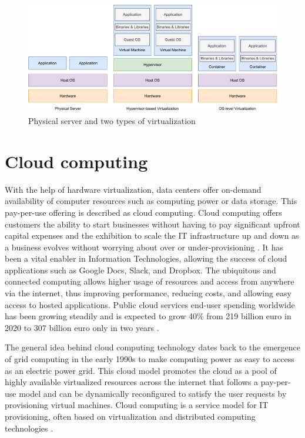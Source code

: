 \begin{figure}[ht]
  \begin{center}
    \includegraphics[width=13.5cm]{images/VirtualizationTypes.pdf}
    \caption{Physical server and two types of virtualization}
    \label{fig:VirtualizationTypes}
  \end{center}
\end{figure}

\section{Cloud computing}

With the help of hardware virtualization, data centers offer on-demand availability of computer resources such as computing power or data storage. This pay-per-use offering is described as cloud computing. Cloud computing offers customers the ability to start businesses without having to pay significant upfront capital expenses and the exhibition to scale the IT infrastructure up and down as a business evolves without worrying about over or under-provisioning \cite{Xing2012}\cite{Toimela2017}. It has been a vital enabler in Information Technologies, allowing the success of cloud applications such as Google Docs, Slack, and Dropbox. The ubiquitous and connected computing allows higher usage of resources and access from anywhere via the internet, thus improving performance, reducing costs, and allowing easy access to hosted applications. Public cloud services end-user spending worldwide has been growing steadily and is expected to grow 40\% from 219 billion euro in 2020 to 307 billion euro only in two years \cite{PublicCloudStatista}.

The general idea behind cloud computing technology dates back to the emergence of grid computing in the early 1990s to make computing power as easy to access as an electric power grid. This cloud model promotes the cloud as a pool of highly available virtualized resources across the internet that follows a pay-per-use model and can be dynamically reconfigured to satisfy the user requests by provisioning virtual machines. Cloud computing is a service model for IT provisioning, often based on virtualization and distributed computing technologies \cite{Lombardi2011}. \cite{Xing2012}

